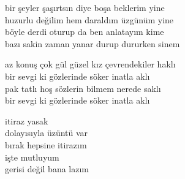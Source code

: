 \documentclass[10pt, openright, oneside]{memoir}
\theoremstyle{definition}
\begin{document}
\settowidth{\versewidth}{bir şeyler şaşırtsın diye boşa beklerim yine}
\begin{cverse}
  bir şeyler şaşırtsın diye boşa beklerim yine \\
  huzurlu değilim hem daraldım üzgünüm yine \\
  böyle derdi oturup da ben anlatayım kime \\
  bazı sakin zaman yanar durup dururken sinem \\
\end{cverse}
\vspace*{\fill}
%
\newpage
{}
\vspace*{\fill}
\settowidth{\versewidth}{az konuş çok gül güzel kız çevrendekiler haklı}
\begin{cverse}
  az konuş çok gül güzel kız çevrendekiler haklı \\
  bir sevgi ki gözlerinde söker inatla aklı \\
  pak tatlı hoş sözlerin bilmem nerede saklı \\
  bir sevgi ki gözlerinde söker inatla aklı \\
\end{cverse}
\vspace*{\fill}
%
\newpage
{}
\vspace*{\fill}
\settowidth{\versewidth}{gerisi değil bana lazım}
\begin{cverse}
  itiraz yasak \\
  dolayısıyla üzüntü var \\
  bırak hepsine itirazım \\
  işte mutluyum \\
  gerisi değil bana lazım \\
\end{cverse}
\vspace*{\fill}
\let\clearpage\relax
\end{document}
